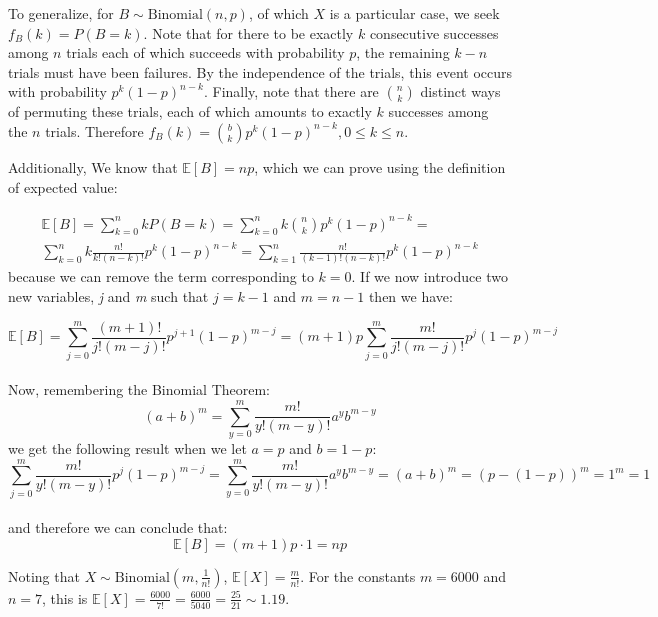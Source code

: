 \documentclass[11pt, oneside]{article}   	%
\begin{document}
To generalize, for $B \sim \text{Binomial}(n, p)$, of which $X$ is a particular case, we seek $f_B(k) = P(B = k)$. Note that for there to be exactly $k$ consecutive successes among $n$ trials each of which succeeds with probability $p$, the remaining $k - n$ trials must have been failures. By the independence of the trials, this event occurs with probability $p^k(1-p)^{n-k}$. Finally, note that there are ${n \choose k}$ distinct ways of permuting these trials, each of which amounts to exactly $k$ successes among the $n$ trials. Therefore $f_B(k) = {b \choose k}p^k(1-p)^{n-k}, 0 \leq k \leq n$.

Additionally, We know that $\mathbb{E}[B] = np$, which we can prove using the definition of expected value:

\begin{equation*}
\begin{split}
  \mathbb{E}[B] = \sum_{k=0}^{n}kP(B=k)=
  \sum_{k=0}^{n}k\binom{n}{k}p^k(1-p)^{n-k}=\\
  \sum_{k=0}^{n}k \frac{n!}{k!(n-k)!}p^k(1-p)^{n-k}=
  \sum_{k=1}^{n}\frac{n!}{(k-1)!(n-k)!}p^k(1-p)^{n-k}
\end{split}
\end{equation*}
because we can remove the term corresponding to $k=0$. If we now introduce two new variables, \textit{j} and \textit{m} such that $j=k-1$ and $m=n-1$ then we have:

$$\mathbb{E}[B]=\sum_{j=0}^{m}\frac{(m+1)!}{j!(m-j)!}p^{j+1}(1-p)^{m-j}=(m+1)p\sum_{j=0}^m\frac{m!}{j!(m-j)!}p^j(1-p)^{m-j}$$\\
Now, remembering the Binomial Theorem:
\begin{equation}\label{eqn:bt}
(a+b)^m=\sum_{y=0}^{m}\frac{m!}{y!(m-y)!}a^yb^{m-y}
\end{equation}
we get the following result when we let $a=p$ and $b=1-p$:\\
\begin{equation*}
  \sum_{j=0}^{m}\frac{m!}{y!(m-y)!}p^j(1-p)^{m-j}=
  \sum_{y=0}^{m}\frac{m!}{y!(m-y)!}a^yb^{m-y}=
  (a+b)^m=(p-(1-p))^m=1^m=1
\end{equation*}\\
and therefore we can conclude that:
$$\mathbb{E}[B]=(m+1)p\cdot 1=np$$

Noting that $X \sim \text{Binomial}(m,\frac{1}{n!})$, $\mathbb{E}[X] = \frac{m}{n!}$. For the constants $m = 6000$ and $n = 7$, this is $\mathbb{E}[X] = \frac{6000}{7!} = \frac{6000}{5040} = \frac{25}{21} \sim 1.19$.
\end{document}
